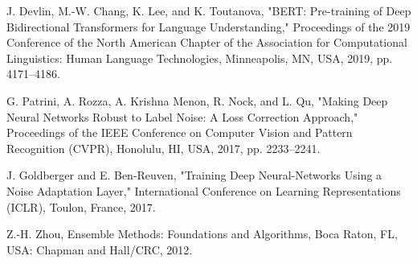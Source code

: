 \documentclass{article}
\begin{document}
\begin{thebibliography}{99}
J. Devlin, M.-W. Chang, K. Lee, and K. Toutanova, "BERT: Pre-training of Deep Bidirectional Transformers for Language Understanding," Proceedings of the 2019 Conference of the North American Chapter of the Association for Computational Linguistics: Human Language Technologies, Minneapolis, MN, USA, 2019, pp. 4171–4186.

G. Patrini, A. Rozza, A. Krishna Menon, R. Nock, and L. Qu, "Making Deep Neural Networks Robust to Label Noise: A Loss Correction Approach," Proceedings of the IEEE Conference on Computer Vision and Pattern Recognition (CVPR), Honolulu, HI, USA, 2017, pp. 2233–2241.

J. Goldberger and E. Ben-Reuven, "Training Deep Neural-Networks Using a Noise Adaptation Layer," International Conference on Learning Representations (ICLR), Toulon, France, 2017.

Z.-H. Zhou, Ensemble Methods: Foundations and Algorithms, Boca Raton, FL, USA: Chapman and Hall/CRC, 2012.
\end{thebibliography}

\newpage
\hypertarget{apdxA}{}
\appendixpage
{}
\end{document}

